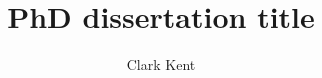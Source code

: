 \documentclass[12pt]{ozuthesis}
\title{PhD dissertation title}
\author{Clark Kent}
\begin{document}


\begin{frontmatter}
    
    
    
    \makeTOC
    \makeListOfTables
    \makeListOfFigures
    
\end{frontmatter}

\begin{thesisbody}
    
    
    
    \makeBibliography
    
\end{thesisbody}
\end{document}
